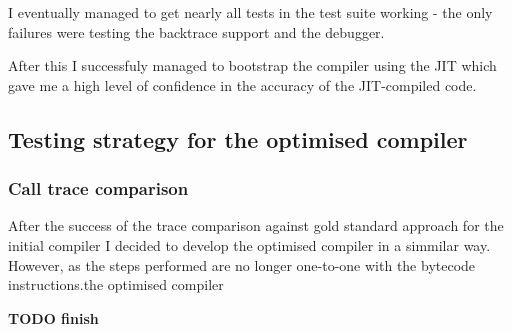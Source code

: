 I eventually managed to get nearly all tests in the test suite working - the only failures were
testing the backtrace support and the debugger.

After this I successfuly managed to bootstrap the compiler using the JIT which gave me a high level
of confidence in the accuracy of the JIT-compiled code.

\subsection{Testing strategy for the optimised compiler}

\subsubsection{Call trace comparison}

After the success of the trace comparison against gold standard approach for the initial compiler I
decided to develop the optimised compiler in a simmilar way. However, as the steps performed are no
longer
one-to-one with the bytecode instructions.the optimised compiler

\textbf{TODO finish}

% 
% 
% 
% 

